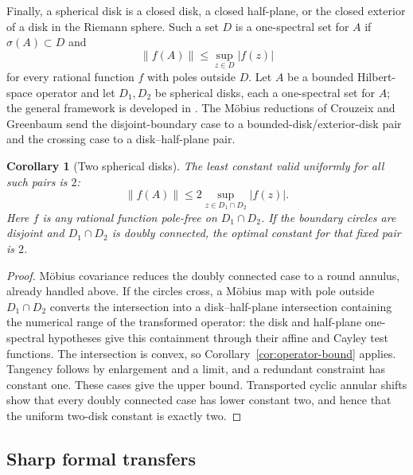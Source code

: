\documentclass[preprints,article,submit,oneauthor]{Definitions/mdpi}
\newcounter{manuscriptresult}[section]
\theoremstyle{mdpi}
\newtheorem{corollary}[manuscriptresult]{Corollary}
\theoremstyle{definition}
\begin{document}
Finally, a spherical disk is a closed disk, a closed half-plane, or the
closed exterior of a disk in the Riemann sphere.  Such a set $D$ is a
one-spectral set for $A$ if $\sigma(A)\subset D$ and
\[
  \lVert f(A)\rVert\leq\sup_{z\in D}\lvert f(z)\rvert
\]
for every rational function $f$ with poles outside $D$.  Let $A$ be a
bounded Hilbert-space operator and let $D_1,D_2$ be spherical disks,
each a one-spectral set for $A$; the general framework is developed in
\cite{BadeaBeckermannCrouzeix2009}.
The M\"obius reductions of Crouzeix and Greenbaum
\cite{CrouzeixGreenbaum2019} send the disjoint-boundary case to a
bounded-disk/exterior-disk pair and the crossing case to a
disk--half-plane pair.

\begin{corollary}[Two spherical disks]
\label{cor:two-disks-discussion}
The least constant valid uniformly for all such pairs is $2$:
\[
  \lVert f(A)\rVert\leq2
  \sup_{z\in D_1\cap D_2}\lvert f(z)\rvert.
\]
Here $f$ is any rational function pole-free on $D_1\cap D_2$.  If the
boundary circles are disjoint and $D_1\cap D_2$ is doubly connected,
the optimal constant for that fixed pair is $2$.
\end{corollary}

\begin{proof}
M\"obius covariance reduces the doubly connected case to a round
annulus, already handled above.  If the circles
cross, a M\"obius map with pole outside $D_1\cap D_2$ converts the
intersection into a disk--half-plane intersection containing the
numerical range of the transformed operator: the disk and half-plane
one-spectral hypotheses give this containment through their affine
and Cayley test functions.  The intersection is convex, so
Corollary~\ref{cor:operator-bound} applies.  Tangency follows by
enlargement and a limit, and a redundant constraint has constant one.
These cases give the upper bound.  Transported cyclic annular shifts
show that every doubly connected case has lower constant two, and
hence that the
uniform two-disk constant is exactly two.
\end{proof}

\subsection{Sharp formal transfers}
\end{document}

